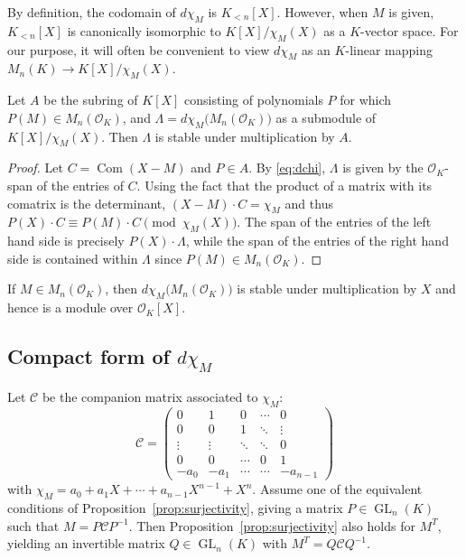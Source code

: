 \documentclass{sig-alternate-05-2015}
\DeclareMathOperator{\GL}{GL}
\DeclareMathOperator{\com}{Com}
\newcommand{\OK}{\mathcal{O}_K}
\begin{document}
By definition, the codomain of $d \chi_M$ is $K_{< n}[X]$. 
However, when $M$ is given, $K_{< n}[X]$ is canonically isomorphic
to $K[X]/\chi_M(X)$ as a $K$-vector space. For our purpose, it will 
often be convenient to view $d \chi_M$ as an $K$-linear mapping
$M_n(K) \to K[X]/\chi_M(X)$.

\begin{prop}
Let $A$ be the subring of $K[X]$ consisting of polynomials $P$ for
which $P(M) \in M_n(\OK)$, and $\Lambda = d \chi_M \big(M_n(\OK)\big)$
as a submodule of $K[X]/\chi_M(X)$.  Then $\Lambda$ is stable under 
multiplication by $A$.
\end{prop}
\begin{proof}
Let $C = \com(X-M)$ and $P \in A$.  By \eqref{eq:dchi}, $\Lambda$ is given by
the $\OK$-span of the entries of $C$.   Using the fact that the product of a matrix
with its comatrix is the determinant, $(X - M) \cdot C = \chi_M$ and thus
$P(X) \cdot C \equiv P(M) \cdot C \pmod{\chi_M(X)}$.  The span of the entries
of the left hand side is precisely $P(X) \cdot \Lambda$, while the span of the entries
of the right hand side is contained within $\Lambda$ since $P(M) \in M_n(\OK)$.
\end{proof}

\begin{cor}
If $M \in M_n(\OK)$, then $d \chi_M \big(M_n(\OK)\big)$ 
is stable under multiplication by $X$ and hence is a module over $\OK[X]$.
\end{cor}

\subsection{Compact form of $d \chi_M$}

Let $\mathscr{C}$ be the companion matrix associated to $\chi_M$:
\begin{equation}
\label{eq:companion}
\mathscr{C} = \left( \begin{matrix}
0 & 1 & 0 & \cdots & 0 \\
0 & 0 & 1 & \ddots & \vdots \\
\vdots & \vdots & \ddots & \ddots & 0 \\
0 & 0 & \cdots & 0 & 1 \\
-a_0 & -a_1 & \cdots & \cdots & -a_{n-1}
\end{matrix} \right)
\end{equation}
with $\chi_M = a_0 + a_1 X + \cdots + a_{n-1} X^{n-1} + X^n$.
Assume one of the equivalent conditions of Proposition~\ref{prop:surjectivity}, giving a matrix 
$P \in \GL_n(K)$ such that $M = P \mathscr{C} P^{-1}$. Then Proposition~\ref{prop:surjectivity}
also holds for $M^T$, yielding an
invertible matrix $Q \in \GL_n(K)$ with $M^T = Q \mathscr{C} Q^{-1}$.
\end{document}
